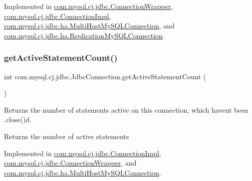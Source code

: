 Implemented in \mbox{\hyperlink{classcom_1_1mysql_1_1cj_1_1jdbc_1_1_connection_wrapper_acc869cfc6c1bc921c9c1d46b4cd261b4}{com.\+mysql.\+cj.\+jdbc.\+Connection\+Wrapper}}, \mbox{\hyperlink{classcom_1_1mysql_1_1cj_1_1jdbc_1_1_connection_impl_acc626e9289e8a7591bf56f0df92f4ef1}{com.\+mysql.\+cj.\+jdbc.\+Connection\+Impl}}, \mbox{\hyperlink{classcom_1_1mysql_1_1cj_1_1jdbc_1_1ha_1_1_multi_host_my_s_q_l_connection_a66ac2a6eb7f2c971e62d47c92624f818}{com.\+mysql.\+cj.\+jdbc.\+ha.\+Multi\+Host\+My\+S\+Q\+L\+Connection}}, and \mbox{\hyperlink{classcom_1_1mysql_1_1cj_1_1jdbc_1_1ha_1_1_replication_my_s_q_l_connection_af2fc965f281a5dfafc5af16aaa200ef3}{com.\+mysql.\+cj.\+jdbc.\+ha.\+Replication\+My\+S\+Q\+L\+Connection}}.

\mbox{\label{interfacecom_1_1mysql_1_1cj_1_1jdbc_1_1_jdbc_connection_aea218879f6bae7ed7717a257876582db}} 
\subsubsection{\texorpdfstring{get\+Active\+Statement\+Count()}{getActiveStatementCount()}}
{\footnotesize\ttfamily int com.\+mysql.\+cj.\+jdbc.\+Jdbc\+Connection.\+get\+Active\+Statement\+Count (\begin{DoxyParamCaption}{ }\end{DoxyParamCaption})}

Returns the number of statements active on this connection, which haven\textquotesingle{}t been .close()d.

\begin{DoxyReturn}{Returns}
the number of active statements 
\end{DoxyReturn}


Implemented in \mbox{\hyperlink{classcom_1_1mysql_1_1cj_1_1jdbc_1_1_connection_impl_a858f89a9745e2ffc3e748c91286d7862}{com.\+mysql.\+cj.\+jdbc.\+Connection\+Impl}}, \mbox{\hyperlink{classcom_1_1mysql_1_1cj_1_1jdbc_1_1_connection_wrapper_ad356fedacaf160823158cc253f99322a}{com.\+mysql.\+cj.\+jdbc.\+Connection\+Wrapper}}, and \mbox{\hyperlink{classcom_1_1mysql_1_1cj_1_1jdbc_1_1ha_1_1_multi_host_my_s_q_l_connection_a5f85b0597c870954959bd5c2a48ae28b}{com.\+mysql.\+cj.\+jdbc.\+ha.\+Multi\+Host\+My\+S\+Q\+L\+Connection}}.

